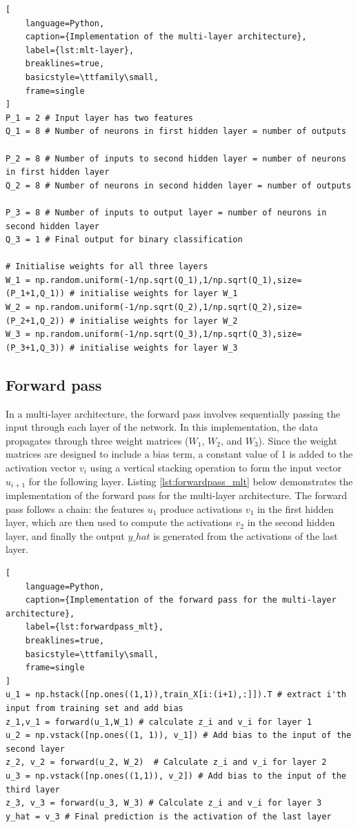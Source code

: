\documentclass[11pt]{article}
\begin{document}
\begin{lstlisting}[
    language=Python, 
    caption={Implementation of the multi-layer architecture},
    label={lst:mlt-layer},
    breaklines=true,
    basicstyle=\ttfamily\small,
    frame=single
]
P_1 = 2 # Input layer has two features
Q_1 = 8 # Number of neurons in first hidden layer = number of outputs

P_2 = 8 # Number of inputs to second hidden layer = number of neurons in first hidden layer
Q_2 = 8 # Number of neurons in second hidden layer = number of outputs

P_3 = 8 # Number of inputs to output layer = number of neurons in second hidden layer
Q_3 = 1 # Final output for binary classification

# Initialise weights for all three layers
W_1 = np.random.uniform(-1/np.sqrt(Q_1),1/np.sqrt(Q_1),size=(P_1+1,Q_1)) # initialise weights for layer W_1
W_2 = np.random.uniform(-1/np.sqrt(Q_2),1/np.sqrt(Q_2),size=(P_2+1,Q_2)) # initialise weights for layer W_2
W_3 = np.random.uniform(-1/np.sqrt(Q_3),1/np.sqrt(Q_3),size=(P_3+1,Q_3)) # initialise weights for layer W_3
\end{lstlisting}

\subsection*{Forward pass}
In a multi-layer architecture, the forward pass involves sequentially passing the input through each layer of the network. In this implementation, 
the data propagates through three weight matrices ($W_1$, $W_2$, and $W_3$). Since the weight matrices are designed to include a bias term, a constant value of 1 is added to the activation vector 
$v_i$ using a vertical stacking operation to form the input vector $u_{i+1}$ for the following layer. Listing \ref{lst:forwardpass_mlt} below demonstrates the implementation of the forward pass for the multi-layer architecture.
The forward pass follows a chain: the features $u_1$ produce activations $v_1$ in the first hidden layer, which are then used to compute the activations $v_2$ in the second hidden layer, and finally the output $y\_hat$ is generated from the activations of the last layer.

\begin{lstlisting}[
    language=Python, 
    caption={Implementation of the forward pass for the multi-layer architecture},
    label={lst:forwardpass_mlt},
    breaklines=true,
    basicstyle=\ttfamily\small,
    frame=single
]
u_1 = np.hstack([np.ones((1,1)),train_X[i:(i+1),:]]).T # extract i'th input from training set and add bias
z_1,v_1 = forward(u_1,W_1) # calculate z_i and v_i for layer 1
u_2 = np.vstack([np.ones((1, 1)), v_1]) # Add bias to the input of the second layer
z_2, v_2 = forward(u_2, W_2)  # Calculate z_i and v_i for layer 2
u_3 = np.vstack([np.ones((1,1)), v_2]) # Add bias to the input of the third layer
z_3, v_3 = forward(u_3, W_3) # Calculate z_i and v_i for layer 3
y_hat = v_3 # Final prediction is the activation of the last layer
\end{lstlisting}
\end{document}
